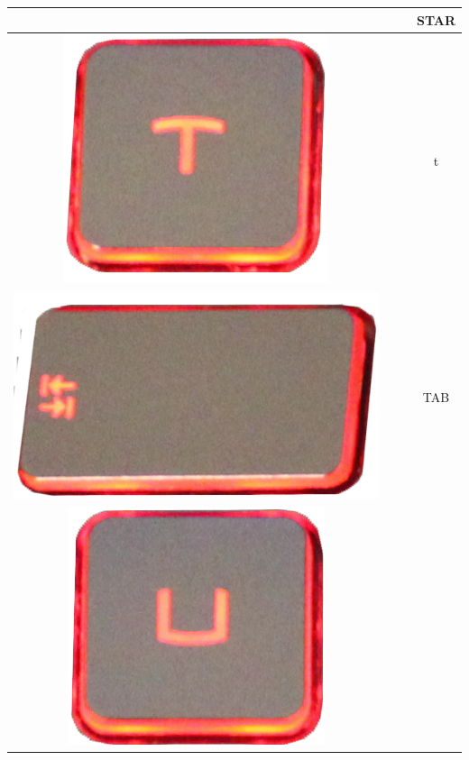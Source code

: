 \begin{longtable}{cccc}
\begin{minipage}[c]{.3\textwidth}
\vspace{0.2cm}
\end{minipage} & & & STAR\\
\hline
\begin{minipage}[c]{.3\textwidth}
\vspace{0.2cm}
\includegraphics[scale=0.1]{Images/KeyMapping/t}
\vspace{0.2cm}
\end{minipage} & & & t\\
\hline
\begin{minipage}[c]{.3\textwidth}
\vspace{0.2cm}
\includegraphics[scale=0.1]{Images/KeyMapping/TAB}
\vspace{0.2cm}
\end{minipage} & & & TAB\\
\hline
\begin{minipage}[c]{.3\textwidth}
\vspace{0.2cm}
\includegraphics[scale=0.1]{Images/KeyMapping/u}

\end{minipage}
\end{longtable}
